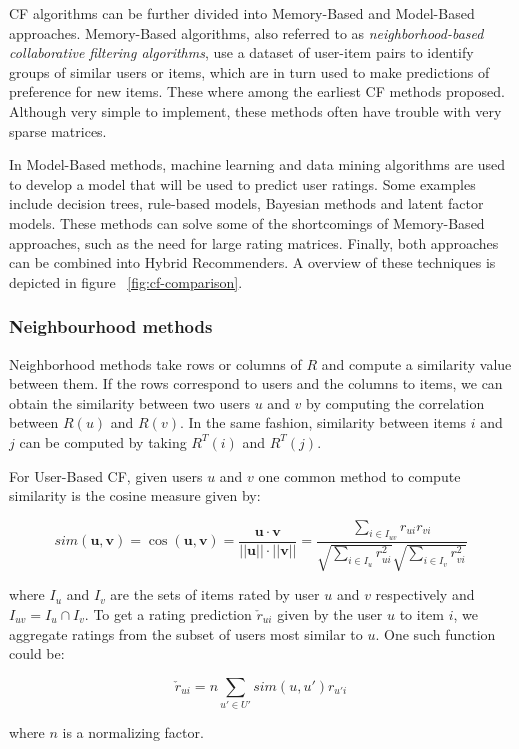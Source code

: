 \documentclass[cic,tc,english]{iiufrgs}
\begin{document}
CF algorithms can be further divided into Memory-Based and Model-Based approaches. Memory-Based algorithms, also referred to as \textit{neighborhood-based collaborative filtering algorithms}, use a dataset of user-item pairs to identify groups of similar users or items, which are in turn used to make predictions of preference for new items. These where among the earliest CF methods proposed. Although very simple to implement, these methods often have trouble with very sparse matrices.

In Model-Based methods, machine learning and data mining algorithms are used to develop a model that will be used to predict user ratings. Some examples include decision trees, rule-based models, Bayesian methods and latent factor models. These methods can solve some of the shortcomings of Memory-Based approaches, such as the need for large rating matrices. Finally, both approaches can be combined into Hybrid Recommenders. A overview of these techniques is depicted in figure ~\ref{fig:cf-comparison}.

\subsubsection{Neighbourhood methods}
Neighborhood methods take rows or columns of \(R\) and compute a similarity value between them. If the rows correspond to users and the columns to items, we can obtain the similarity between two users \(u\) and \(v\) by computing the correlation between \(R(u)\) and \(R(v)\). In the same fashion, similarity between items \(i\) and \(j\) can be computed by taking \(R^T(i)\) and \(R^T(j)\).

For User-Based CF, given users \(u\) and \(v\) one common method to compute similarity is the cosine measure given by:

\[sim(\pmb u, \pmb v) = \cos(\pmb u, \pmb v) = \frac {\pmb u \cdot \pmb v}{||\pmb u|| \cdot ||\pmb v||} = \frac{\sum_{i \in I_{uv}} r_{ui}r_{vi}}{\sqrt{\sum_{i \in I_u} r_{ui}^2}\sqrt{\sum_{i \in I_v} r_{vi}^2}}\]

where $I_u$ and $I_v$ are the sets of items rated by user $u$ and $v$ respectively and $I_{uv} = I_u \cap I_v$. 
To get a rating prediction $\check{r}_{ui}$ given by the user $u$ to item $i$, we aggregate ratings from the subset of users most similar to $u$. One such function could be:

$$
\check{r}_{ui} = n \sum_{u' \in U'} sim(u, u')r_{u'i}
$$

where $n$ is a normalizing factor.
\end{document}
